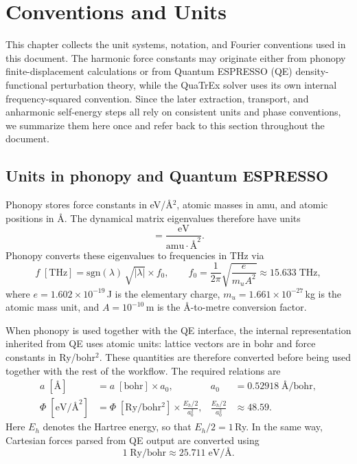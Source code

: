 \chapter{Conventions and Units}
\label{ch:conventions_units}

This chapter collects the unit systems, notation, and Fourier
conventions used in this document.  The harmonic force
constants may originate either from phonopy finite-displacement
calculations or from Quantum ESPRESSO (QE) density-functional
perturbation theory, while the QuaTrEx solver uses its own internal
frequency-squared convention.  Since the later extraction, transport,
and anharmonic self-energy steps all rely on consistent units and phase
conventions, we summarize them here once and refer back to this section
throughout the document.

\section{Units in phonopy and Quantum ESPRESSO}
\label{sec:phonopy_units}

Phonopy stores force constants in eV/\AA$^2$, atomic masses in amu, and
atomic positions in \AA.  The dynamical matrix eigenvalues therefore
have units
\begin{equation}
  [\lambda] = \frac{\mathrm{eV}}{\mathrm{amu}\cdot\mathrm{\si{\angstrom}}^2}.
\end{equation}
Phonopy converts these eigenvalues to frequencies in THz via
\begin{equation}\label{eq:VaspToTHz}
  f\;[\mathrm{THz}]
  = \mathrm{sgn}(\lambda)\,\sqrt{|\lambda|}
    \times f_0,
  \qquad
  f_0 = \frac{1}{2\pi}\sqrt{\frac{e}{m_u A^2}} \approx 15.633\;\mathrm{THz},
\end{equation}
where $e = 1.602\times 10^{-19}$\,J is the elementary charge,
$m_u = 1.661\times 10^{-27}$\,kg is the atomic mass unit, and
$A = 10^{-10}$\,m is the \AA-to-metre conversion factor.

When phonopy is used together with the QE interface, the internal
representation inherited from QE uses atomic units: lattice vectors are
in bohr and force constants in Ry/bohr$^2$.  These quantities are
therefore converted before being used together with the rest of the
workflow.  The required relations are
\begin{align}
  a\;[\mathrm{\si{\angstrom}}]
    &= a\;[\mathrm{bohr}] \times a_0,
    & a_0 &= 0.52918\;\mathrm{\si{\angstrom}/bohr}, \\
  \Phi\;[\mathrm{eV/\si{\angstrom}^2}]
    &= \Phi\;[\mathrm{Ry/bohr^2}] \times \frac{E_h/2}{a_0^2},
    & \frac{E_h/2}{a_0^2} &\approx 48.59.
\end{align}
Here $E_h$ denotes the Hartree energy, so that $E_h/2 = 1$\,Ry.  In the
same way, Cartesian forces parsed from QE output are converted using
\begin{equation}
  1\;\mathrm{Ry/bohr} \approx 25.711\;\mathrm{eV/\si{\angstrom}}.
\end{equation}

